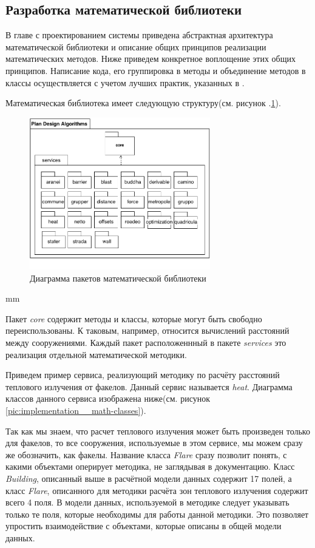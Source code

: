 \subsection{\large{Разработка математической библиотеки}}

В главе с проектированием системы приведена абстрактная архитектура математической библиотеки
и описание общих принципов реализации математических методов. Ниже приведем конкретное воплощение этих общих принципов.
Написание кода, его группировка в методы и объединение методов в классы осуществляется с учетом лучших практик,
указанных в \cite{CleanCode}.

Математическая библиотека имеет следующую структуру(см. рисунок .\ref{pic:implementation__math-packages}).

\begin{figure}[H]
	\includegraphics[width=0.7\textwidth]{implementation/pictures/math/packages}
	\caption{Диаграмма пакетов математической библиотеки}
	\label{pic:implementation__math-packages}
\end{figure}
 mm

Пакет \textit{core} содержит методы и классы, которые могут быть свободно переиспользованы.
К таковым, например, относится вычислений расстояний между сооружениями.
Каждый пакет расположеннный в пакете \textit{services} это реализация отдельной математической методики.

Приведем пример сервиса, реализующий
методику по расчёту расстояний теплового излучения от факелов. Данный сервис называется \textit{heat}.
Диаграмма классов данного сервиса изображена ниже(см. рисунок \ref{pic:implementation__math-classes}).

Так как мы знаем, что расчет теплового излучения может быть произведен только для факелов, то все сооружения,
используемые в этом сервисе, мы можем сразу же обозначить, как факелы. Название класса \textit{Flare} сразу позволит
понять, с какими объектами оперирует методика, не заглядывая в документацию.
Класс \textit{Building}, описанный выше в расчётной модели данных содержит 17 полей, а класс \textit{Flare}, описанного для методики расчёта
зон теплового излучения содержит всего 4 поля. В модели данных, используемой в методике следует указывать только те поля,
которые необходимы для работы данной методики. Это позволяет упростить взаимодействие с объектами, которые
описаны в общей модели данных.

